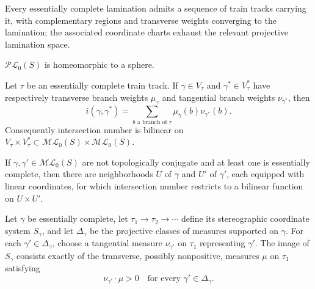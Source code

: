 \begin{proposition}
\label{thurston-ch09-train-track-approximation}
 Every essentially complete lamination admits a sequence of train tracks carrying it, with complementary regions and transverse weights converging to the lamination; the associated coordinate charts exhaust the relevant projective lamination space.
\end{proposition}

\begin{corollary}
\label{thurston-ch09-projective-lamination-sphere}
 $\mathcal{PL}_0(S)$ is homeomorphic to a sphere.
\end{corollary}

\begin{proposition}
\label{thurston-ch09-train-track-intersection}
 Let $\tau$ be an essentially complete train track.  If
$\gamma\in V_\tau$ and $\gamma^*\in V_\tau^*$ have respectively transverse
branch weights $\mu_\gamma$ and tangential branch weights $\nu_{\gamma^*}$,
then
\[
 i(\gamma,\gamma^*)=
 \sum_{b\text{ a branch of }\tau}\mu_\gamma(b)\nu_{\gamma^*}(b).
\]
Consequently intersection number is bilinear on
$V_\tau\times V_\tau^*\subset\mathcal{ML}_0(S)\times\mathcal{ML}_0(S)$.
\end{proposition}

\begin{corollary}
\label{thurston-ch09-nonconjugate-lamination-separation}
 If $\gamma,\gamma'\in\mathcal{ML}_0(S)$ are not topologically conjugate and
at least one is essentially complete, then there are neighborhoods $U$ of
$\gamma$ and $U'$ of $\gamma'$, each equipped with linear coordinates, for
which intersection number restricts to a bilinear function on $U\times U'$.
\end{corollary}

\begin{proposition}
\label{thurston-ch09-transverse-lamination-image}
 Let $\gamma$ be essentially complete, let
$\tau_1\to\tau_2\to\cdots$ define its stereographic coordinate system
$S_\gamma$, and let $\Delta_\gamma$ be the projective classes of measures
supported on $\gamma$.  For each $\gamma'\in\Delta_\gamma$, choose a
tangential measure $\nu_{\gamma'}$ on $\tau_1$ representing $\gamma'$.  The
image of $S_\gamma$ consists exactly of the transverse, possibly nonpositive,
measures $\mu$ on $\tau_1$ satisfying
\[
 \nu_{\gamma'}\mathbin{\cdot}\mu>0
 \quad\text{for every }\gamma'\in\Delta_\gamma.
\]
\end{proposition}

